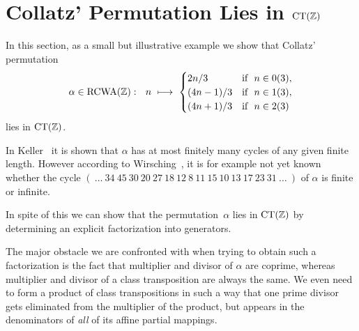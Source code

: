 \documentclass{amsart}
\theoremstyle{definition} \newtheorem{CTZDefinition}{Definition}[section]
\theoremstyle{plain}      \newtheorem{CTZPropertiesTheorem}[CTZDefinition]{Theorem}
\theoremstyle{plain}      \newtheorem{CTZSubgroupsTheorem}[CTZDefinition]{Theorem}
\theoremstyle{definition} \newtheorem{RcwaMappingDefinition}{Definition}[section]
\theoremstyle{definition} \newtheorem{RCWADefinition}[RcwaMappingDefinition]{Definition}
\theoremstyle{plain}      \newtheorem{CTZNotFinitelyGeneratedTheorem}
\theoremstyle{definition} \newtheorem{CTZSmEmbeddingDefinition}[RcwaMappingDefinition]{Definition}
\theoremstyle{plain}      \newtheorem{CTZHighlyTransitiveTheorem}[RcwaMappingDefinition]{Theorem}
\theoremstyle{plain}      \newtheorem{CTZTorsionElementsDivisibleTheorem}
\theoremstyle{plain}      \newtheorem{CTLemma}{Lemma}[section]
\theoremstyle{plain}      \newtheorem{IntegralCommutatorLemma}[CTLemma]{Lemma}
\theoremstyle{plain}      \newtheorem{NormalSubgroupContainsIntegralElementLemma}[CTLemma]{Lemma}
\theoremstyle{plain}      \newtheorem{CTZSimpleTheorem}[CTLemma]{Theorem}
\theoremstyle{remark}     \newtheorem{CTZSimpleRemark}[CTLemma]{Remark}
\theoremstyle{definition} \newtheorem{CTPZDefinition}[CTLemma]{Definition}
\theoremstyle{plain}      \newtheorem{CTPZSimpleCorollary}[CTLemma]{Corollary}
\theoremstyle{plain}      \newtheorem{CTPZSimpleProblem}[CTLemma]{Problem}
\theoremstyle{plain}      \newtheorem{FnPSL2ZEmbeddingTheorem}{Theorem}[section]
\theoremstyle{plain}      \newtheorem{FreeProductEmbeddingTheorem}[FnPSL2ZEmbeddingTheorem]{Theorem}
\theoremstyle{definition} \newtheorem{RestrictionMonomorphismDefinition}
\theoremstyle{plain}      \newtheorem{DirectAndWreathProductsEmbeddingTheorem}
\theoremstyle{plain}      \newtheorem{DirectAndWreathProductsEmbeddingCorollary}
\theoremstyle{definition} \newtheorem{CTintZDefinition}[FnPSL2ZEmbeddingTheorem]{Definition}
\theoremstyle{plain}      \newtheorem{CTintZSimpleTheorem}[FnPSL2ZEmbeddingTheorem]{Theorem}
\theoremstyle{definition} \newtheorem{KernelDefinition}{Definition}[section]
\theoremstyle{definition} \newtheorem{TameWildDefinition}[KernelDefinition]{Definition}
\theoremstyle{definition} \newtheorem{SimpleSupergroupsDefinition}[KernelDefinition]{Definition}
\theoremstyle{definition} \newtheorem{CSCRDefinition}[KernelDefinition]{Definition}
\theoremstyle{plain}      \newtheorem{SimpleSupergroupsGeneratorsTheorem}[KernelDefinition]{Theorem}
\theoremstyle{plain}      \newtheorem{SimpleSupergroupsTheorem}[KernelDefinition]{Theorem}
\theoremstyle{plain}      \newtheorem{SimpleSupergroupsTransitivityTheorem}
\theoremstyle{plain}      \newtheorem{TameGenerationConjecture}[KernelDefinition]{Conjecture}
\theoremstyle{remark}     \newtheorem{TameGenerationRemark}[KernelDefinition]{Remark}
\begin{document}
\goodbreak

\section{Collatz' Permutation Lies in \(\CT{\ZZ}\)} \label{CollatzPermSection}

\noindent In this section, as a small but illustrative example we show that Collatz' permutation
\[
  \alpha \in \RCWA{\ZZ}: \ \ n \ \longmapsto \
  \begin{cases}
    2n/3       & \text{if} \ \ n \in 0(3), \\
    (4n - 1)/3 & \text{if} \ \ n \in 1(3), \\
    (4n + 1)/3 & \text{if} \ \ n \in 2(3)
  \end{cases}
\]
lies in \(\CT{\ZZ}\).

\goodbreak

In Keller~\cite{Keller99} it is shown that \(\alpha\) has at most finitely many cycles of any
given finite length. However according to Wirsching~\cite{Wirsching96}, it is for example not
yet known whether the cycle
\(( \ \dots \ 34 \ 45 \ 30 \ 20 \ 27 \ 18 \ 12 \
               8 \ 11 \ 15 \ 10 \ 13 \ 17 \ 23 \ 31 \ \dots \ )\)
of \(\alpha\) is finite or infinite.

In spite of this we can show that the permutation~\(\alpha\) lies in \(\CT{\ZZ}\) by determining
an explicit factorization into generators.

The major obstacle we are confronted with when trying to obtain such a factorization is the fact
that multiplier and divisor of \(\alpha\) are coprime, whereas multiplier and divisor of a class
transposition are always the same. We even need to form a product of class transpositions in such
a way that one prime divisor gets eliminated from the multiplier of the product, but appears in
the denominators of \emph{all} of its affine partial mappings.
\end{document}

